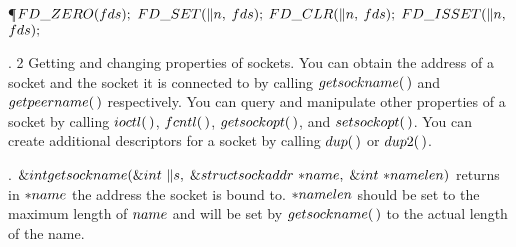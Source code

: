 \Y\P $\\{FD\_ZERO}(\\{fds});$\5
\6
$\\{FD\_SET}(\|n,\;$$\\{fds});$\5
\6
$\\{FD\_CLR}(\|n,\;$$\\{fds});$\5
\6
$\\{FD\_ISSET}(\|n,\;$$\\{fds});$\5
\par
\fi

. 2 Getting and changing properties of sockets. You can obtain the address
of a
socket and the socket it is connected to by calling \CD{}$\\{getsockname}(\,)$%
\DC{} and
\CD{}$\\{getpeername}(\,)$\DC{} respectively. You can query and manipulate
other properties of a
socket by calling \CD{}$\\{ioctl}(\,)$\DC{}, \CD{}$\\{fcntl}(\,)$\DC{}, \CD{}$%
\\{getsockopt}(\,)$\DC{}, and \CD{}$\\{setsockopt}(\,)$\DC{}. You
can create additional descriptors for a socket by calling \CD{}$\\{dup}(\,)$%
\DC{} or \CD{}$\\{dup2}(\,)$\DC{}.

\fi

. \CD{}$\&{int}\ \\{getsockname}(\&{int}\ \|s,\;\&{struct}\ \\{sockaddr}\
{*}\\{name},\;\&{int}\ {*}\\{namelen})$\DC{} returns in \CD{}${{*}}\\{name}$%
\DC{} the address
the socket is bound to. \CD{}${{*}}\\{namelen}$\DC{} should be set to the
maximum length of \CD{}$\\{name}$\DC{} and
will be set by \CD{}$\\{getsockname}(\,)$\DC{} to the actual length of the
name.

\fi

